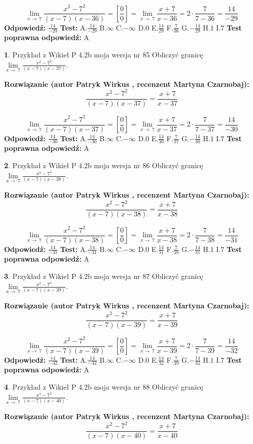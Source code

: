\documentclass[12pt, a4paper]{article}
\theoremstyle{definition} %
\newtheorem{zad}{}
\newcommand{\zadStart}[1]{\begin{zad}#1\newline}
\newcommand{\zadStop}{\end{zad}}
\newcommand{\rozwStart}[2]{\noindent \textbf{Rozwiązanie (autor #1 , recenzent #2): }\newline}
\newcommand{\rozwStop}{\newline}
\newcommand{\odpStart}{\noindent \textbf{Odpowiedź:}\newline}
\newcommand{\odpStop}{\newline}
\newcommand{\testStart}{\noindent \textbf{Test:}\newline}
\newcommand{\testStop}{\newline}
\newcommand{\kluczStart}{\noindent \textbf{Test poprawna odpowiedź:}\newline}
\newcommand{\kluczStop}{\newline}
\begin{document}
$$\lim\limits_{x\to\ 7}\frac{x^{2}-7^{2}}{(x-7)(x-36)}=[\frac{0}{0}]=\lim\limits_{x\to\ 7}\frac{x+7}{x-36}=2 \cdot \frac{7}{7-36} = \frac{14}{-29}$$
\rozwStop
\odpStart
$\frac{14}{-29}$
\odpStop
\testStart
A.$\frac{14}{-29}$
B.$\infty$
C.$-\infty$
D.$0$
E.$\frac{14}{29}$
F.$\frac{7}{36}$
G.$-\frac{14}{29}$
H.$1$
I.$7$
\testStop
\kluczStart
A
\kluczStop



\zadStart{Przykład z Wikieł P 4.2b moja wersja nr 85}
Obliczyć granicę $\lim\limits_{x\to\ 7}\frac{x^{2}-7^{2}}{(x-7)(x-37)}$.
\zadStop
\rozwStart{Patryk Wirkus}{Martyna Czarnobaj}
$$\frac{x^{2}-7^{2}}{(x-7)(x-37)}=\frac{x+7}{x-37}$$

$$\lim\limits_{x\to\ 7}\frac{x^{2}-7^{2}}{(x-7)(x-37)}=[\frac{0}{0}]=\lim\limits_{x\to\ 7}\frac{x+7}{x-37}=2 \cdot \frac{7}{7-37} = \frac{14}{-30}$$
\rozwStop
\odpStart
$\frac{14}{-30}$
\odpStop
\testStart
A.$\frac{14}{-30}$
B.$\infty$
C.$-\infty$
D.$0$
E.$\frac{14}{30}$
F.$\frac{7}{37}$
G.$-\frac{14}{30}$
H.$1$
I.$7$
\testStop
\kluczStart
A
\kluczStop



\zadStart{Przykład z Wikieł P 4.2b moja wersja nr 86}
Obliczyć granicę $\lim\limits_{x\to\ 7}\frac{x^{2}-7^{2}}{(x-7)(x-38)}$.
\zadStop
\rozwStart{Patryk Wirkus}{Martyna Czarnobaj}
$$\frac{x^{2}-7^{2}}{(x-7)(x-38)}=\frac{x+7}{x-38}$$

$$\lim\limits_{x\to\ 7}\frac{x^{2}-7^{2}}{(x-7)(x-38)}=[\frac{0}{0}]=\lim\limits_{x\to\ 7}\frac{x+7}{x-38}=2 \cdot \frac{7}{7-38} = \frac{14}{-31}$$
\rozwStop
\odpStart
$\frac{14}{-31}$
\odpStop
\testStart
A.$\frac{14}{-31}$
B.$\infty$
C.$-\infty$
D.$0$
E.$\frac{14}{31}$
F.$\frac{7}{38}$
G.$-\frac{14}{31}$
H.$1$
I.$7$
\testStop
\kluczStart
A
\kluczStop



\zadStart{Przykład z Wikieł P 4.2b moja wersja nr 87}
Obliczyć granicę $\lim\limits_{x\to\ 7}\frac{x^{2}-7^{2}}{(x-7)(x-39)}$.
\zadStop
\rozwStart{Patryk Wirkus}{Martyna Czarnobaj}
$$\frac{x^{2}-7^{2}}{(x-7)(x-39)}=\frac{x+7}{x-39}$$

$$\lim\limits_{x\to\ 7}\frac{x^{2}-7^{2}}{(x-7)(x-39)}=[\frac{0}{0}]=\lim\limits_{x\to\ 7}\frac{x+7}{x-39}=2 \cdot \frac{7}{7-39} = \frac{14}{-32}$$
\rozwStop
\odpStart
$\frac{14}{-32}$
\odpStop
\testStart
A.$\frac{14}{-32}$
B.$\infty$
C.$-\infty$
D.$0$
E.$\frac{14}{32}$
F.$\frac{7}{39}$
G.$-\frac{14}{32}$
H.$1$
I.$7$
\testStop
\kluczStart
A
\kluczStop



\zadStart{Przykład z Wikieł P 4.2b moja wersja nr 88}
Obliczyć granicę $\lim\limits_{x\to\ 7}\frac{x^{2}-7^{2}}{(x-7)(x-40)}$.
\zadStop
\rozwStart{Patryk Wirkus}{Martyna Czarnobaj}
$$\frac{x^{2}-7^{2}}{(x-7)(x-40)}=\frac{x+7}{x-40}$$
\end{document}
